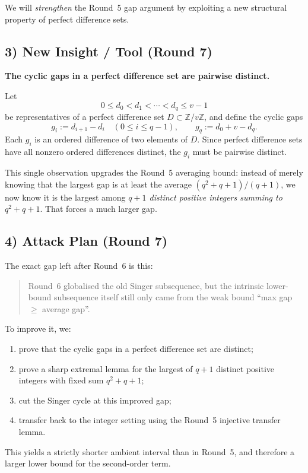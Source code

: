 We will \emph{strengthen} the Round~5 gap argument by exploiting a new structural property of perfect difference sets.

\subsection{3) New Insight / Tool (Round 7)}
\textbf{The cyclic gaps in a perfect difference set are pairwise distinct.}

Let
\[
0\le d_0<d_1<\cdots<d_q\le v-1
\]
be representatives of a perfect difference set $D\subset \mathbb Z/v\mathbb Z$, and define the cyclic gaps
\[
g_i:=d_{i+1}-d_i\quad(0\le i\le q-1),\qquad g_q:=d_0+v-d_q.
\]
Each $g_i$ is an ordered difference of two elements of $D$.
Since perfect difference sets have all nonzero ordered differences distinct, the $g_i$ must be pairwise distinct.

This single observation upgrades the Round~5 averaging bound:
instead of merely knowing that the largest gap is at least the average $(q^2+q+1)/(q+1)$, we now know it is the largest among \emph{$q+1$ distinct positive integers summing to $q^2+q+1$}.
That forces a much larger gap.

\subsection{4) Attack Plan (Round 7)}
The exact gap left after Round~6 is this:

\begin{quote}
Round~6 globalised the old Singer subsequence, but the intrinsic lower-bound subsequence itself still only came from the weak bound ``max gap $\ge$ average gap''.
\end{quote}

To improve it, we:
\begin{enumerate}
\item prove that the cyclic gaps in a perfect difference set are distinct;
\item prove a sharp extremal lemma for the largest of $q+1$ distinct positive integers with fixed sum $q^2+q+1$;
\item cut the Singer cycle at this improved gap;
\item transfer back to the integer setting using the Round~5 injective transfer lemma.
\end{enumerate}

This yields a strictly shorter ambient interval than in Round~5, and therefore a larger lower bound for the second-order term.

